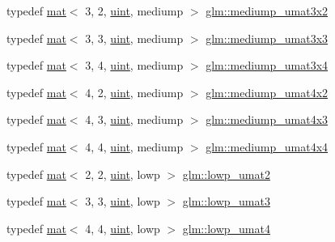 \begin{DoxyCompactItemize}
\item 
typedef \hyperlink{structglm_1_1mat}{mat}$<$ 3, 2, \hyperlink{group__core__precision_ga4fd29415871152bfb5abd588334147c8}{uint}, mediump $>$ \hyperlink{group__gtc__matrix__integer_gad27333d041d86c7b0b78010c5a437846}{glm\+::mediump\+\_\+umat3x2}
\item 
typedef \hyperlink{structglm_1_1mat}{mat}$<$ 3, 3, \hyperlink{group__core__precision_ga4fd29415871152bfb5abd588334147c8}{uint}, mediump $>$ \hyperlink{group__gtc__matrix__integer_gac2563a9d45e3f6be0ceaf62b50a983f5}{glm\+::mediump\+\_\+umat3x3}
\item 
typedef \hyperlink{structglm_1_1mat}{mat}$<$ 3, 4, \hyperlink{group__core__precision_ga4fd29415871152bfb5abd588334147c8}{uint}, mediump $>$ \hyperlink{group__gtc__matrix__integer_ga22e32b4dcd60655044ebbd30f50a2e67}{glm\+::mediump\+\_\+umat3x4}
\item 
typedef \hyperlink{structglm_1_1mat}{mat}$<$ 4, 2, \hyperlink{group__core__precision_ga4fd29415871152bfb5abd588334147c8}{uint}, mediump $>$ \hyperlink{group__gtc__matrix__integer_gaf44e145efd637df6f2a300f968ebb51f}{glm\+::mediump\+\_\+umat4x2}
\item 
typedef \hyperlink{structglm_1_1mat}{mat}$<$ 4, 3, \hyperlink{group__core__precision_ga4fd29415871152bfb5abd588334147c8}{uint}, mediump $>$ \hyperlink{group__gtc__matrix__integer_ga974bc32af0686378c4696208c3103d96}{glm\+::mediump\+\_\+umat4x3}
\item 
typedef \hyperlink{structglm_1_1mat}{mat}$<$ 4, 4, \hyperlink{group__core__precision_ga4fd29415871152bfb5abd588334147c8}{uint}, mediump $>$ \hyperlink{group__gtc__matrix__integer_ga0dcca70aa643639489cf52acf7574e6c}{glm\+::mediump\+\_\+umat4x4}
\item 
typedef \hyperlink{structglm_1_1mat}{mat}$<$ 2, 2, \hyperlink{group__core__precision_ga4fd29415871152bfb5abd588334147c8}{uint}, lowp $>$ \hyperlink{group__gtc__matrix__integer_ga51cca2e9b98db6345e8c60b7d00c79cf}{glm\+::lowp\+\_\+umat2}
\item 
typedef \hyperlink{structglm_1_1mat}{mat}$<$ 3, 3, \hyperlink{group__core__precision_ga4fd29415871152bfb5abd588334147c8}{uint}, lowp $>$ \hyperlink{group__gtc__matrix__integer_gaab0c883cd04a3684accd02854daa7b1d}{glm\+::lowp\+\_\+umat3}
\item 
typedef \hyperlink{structglm_1_1mat}{mat}$<$ 4, 4, \hyperlink{group__core__precision_ga4fd29415871152bfb5abd588334147c8}{uint}, lowp $>$ \hyperlink{group__gtc__matrix__integer_ga41cc5d910308e4b471aa6543ce22dd20}{glm\+::lowp\+\_\+umat4}
\item 

\end{DoxyCompactItemize}
